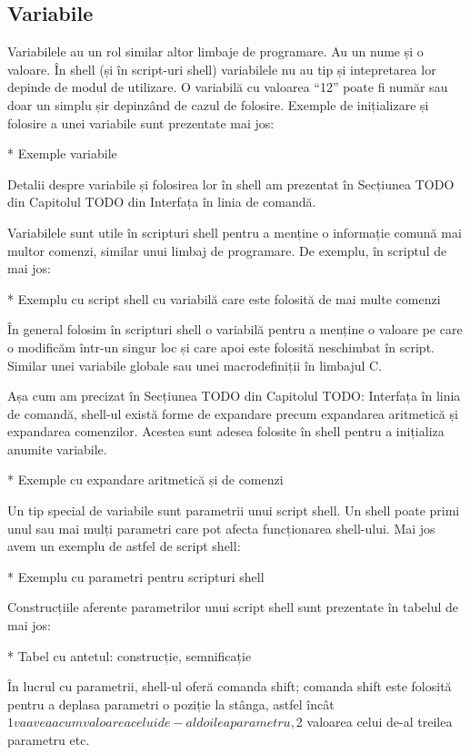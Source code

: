 \subsection{Variabile}
\label{sec:script-func-vars}

Variabilele au un rol similar altor limbaje de programare. Au un nume și o
valoare. În shell (și în script-uri shell) variabilele nu au tip și intepretarea
lor depinde de modul de utilizare. O variabilă cu valoarea “12” poate fi număr
sau doar un simplu șir depinzând de cazul de folosire. Exemple de inițializare
și folosire a unei variabile sunt prezentate mai jos:

* Exemple variabile

Detalii despre variabile și folosirea lor în shell am prezentat în Secțiunea
TODO din Capitolul TODO din Interfața în linia de comandă.

Variabilele sunt utile în scripturi shell pentru a menține o informație comună
mai multor comenzi, similar unui limbaj de programare. De exemplu, în scriptul
de mai jos:

* Exemplu cu script shell cu variabilă care este folosită de mai multe comenzi

În general folosim în scripturi shell o variabilă pentru a menține o valoare pe
care o modificăm într-un singur loc și care apoi este folosită neschimbat în
script. Similar unei variabile globale sau unei macrodefiniții în limbajul C.

Așa cum am precizat în Secțiunea TODO din Capitolul TODO: Interfața în linia de
comandă, shell-ul există forme de expandare precum expandarea aritmetică și
expandarea comenzilor. Acestea sunt adesea folosite în shell pentru a inițializa
anumite variabile.

* Exemple cu expandare aritmetică și de comenzi

Un tip special de variabile sunt parametrii unui script shell. Un shell poate
primi unul sau mai mulți parametri care pot afecta funcționarea shell-ului. Mai
jos avem un exemplu de astfel de script shell:

* Exemplu cu parametri pentru scripturi shell

Construcțiile aferente parametrilor unui script shell sunt prezentate în tabelul
de mai jos:

* Tabel cu antetul: construcție, semnificație

În lucrul cu parametrii, shell-ul oferă comanda shift; comanda shift este
folosită pentru a deplasa parametri o poziție la stânga, astfel încât $1 va avea
acum valoarea celui de-al doilea parametru, $2 valoarea celui de-al treilea
parametru etc.

